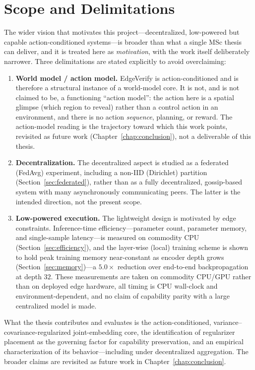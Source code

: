 \section{Scope and Delimitations}
The wider vision that motivates this project---decentralized, low-powered
but capable action-conditioned systems---is broader than what a single
MSc thesis can deliver, and it is treated here as \emph{motivation}, with
the work itself deliberately narrower. Three delimitations are stated
explicitly to avoid overclaiming:
\begin{enumerate}
    \item \textbf{World model / action model.} EdgeVerify is
    action-conditioned and is therefore a structural instance of a
    world-model core. It is not, and is not claimed to be, a functioning
    ``action model'': the action here is a spatial glimpse (which region to
    reveal) rather than a control action in an environment, and there is no
    action \emph{sequence}, planning, or reward. The action-model reading is
    the trajectory toward which this work points, revisited as future work
    (Chapter~\ref{chap:conclusion}), not a deliverable of this thesis.
    \item \textbf{Decentralization.} The decentralized aspect is studied as
    a federated (FedAvg) experiment, including a non-IID (Dirichlet)
    partition (Section~\ref{sec:federated}), rather than as a fully
    decentralized, gossip-based system with many asynchronously
    communicating peers. The latter is the intended direction, not the
    present scope.
    \item \textbf{Low-powered execution.} The lightweight design is
    motivated by edge constraints. Inference-time efficiency---parameter
    count, parameter memory, and single-sample latency---is measured on
    commodity CPU (Section~\ref{sec:efficiency}), and the layer-wise (local)
    training scheme is shown to hold peak training memory near-constant as
    encoder depth grows (Section~\ref{sec:memory})---a $5.0\times$ reduction
    over end-to-end backpropagation at depth $32$. These measurements are
    taken on commodity CPU/GPU rather than on deployed edge hardware, all
    timing is CPU wall-clock and environment-dependent, and no claim of
    capability parity with a large centralized model is made.
\end{enumerate}
What the thesis contributes and evaluates is the action-conditioned,
variance--covariance-regularized joint-embedding core, the identification
of regularizer placement as the governing factor for capability
preservation, and an empirical characterization of its behavior---including
under decentralized aggregation. The broader claims are revisited as future
work in Chapter~\ref{chap:conclusion}.

